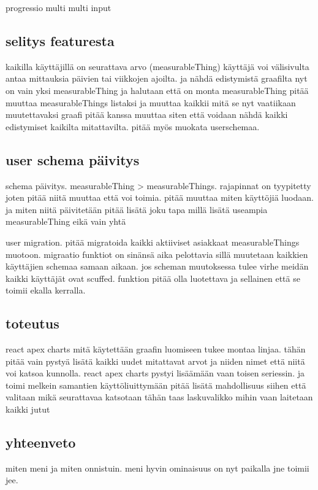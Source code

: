 
progressio multi multi input

\subsection*{selitys featuresta}
kaikilla käyttäjillä on seurattava arvo (measurableThing) käyttäjä voi välisivulta antaa mittauksia päivien tai viikkojen ajoilta. ja nähdä edistymistä graafilta
nyt on vain yksi measurableThing ja halutaan että on monta
measurableThing pitää muuttaa measurableThings listaksi ja muuttaa kaikkii mitä se nyt vaatiikaan muutettavaksi
graafi pitää kanssa muuttaa siten että voidaan nähdä kaikki edistymiset kaikilta mitattavilta.
pitää myös muokata userschemaa.





\subsection*{user schema päivitys}
schema päivitys. measurableThing > measurableThings.  
rajapinnat on tyypitetty joten pitää niitä muuttaa että voi toimia.
pitää muuttaa miten käyttöjiä luodaan. ja miten niitä päivitetään
pitää lisätä joku tapa millä lisätä useampia measurableThing eikä vain yhtä
\medskip

user migration. pitää migratoida kaikki aktiiviset asiakkaat measurableThings muotoon.
migraatio funktiot on sinänsä aika pelottavia sillä muutetaan kaikkien käyttäjien schemaa samaan aikaan. jos scheman muutoksessa tulee virhe meidän kaikki käyttäjät ovat scuffed.
funktion pitää olla luotettava ja sellainen että se toimii ekalla kerralla.
\medskip

\subsection*{toteutus}
react apex charts mitä käytettään graafin luomiseen tukee montaa linjaa. tähän pitää vain pystyä lisätä kaikki uudet mitattavat arvot ja niiden nimet että niitä voi katsoa kunnolla.
react apex charts pystyi lisäämään vaan toisen seriessin. ja toimi melkein samantien
käyttöliuittymään pitää lisätä mahdollisuus siihen että valitaan mikä seurattavaa katsotaan
tähän taas laskuvalikko mihin vaan laitetaan kaikki jutut




\subsection*{yhteenveto}
miten meni ja miten onnistuin.
meni hyvin ominaisuus on nyt paikalla jne toimii jee.
